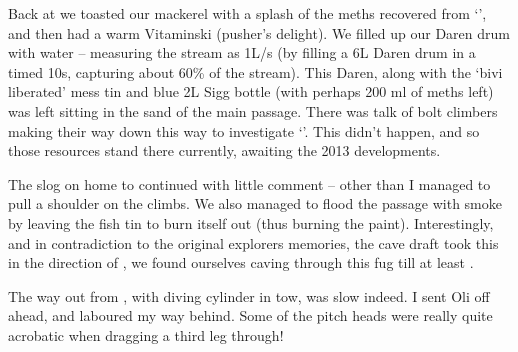 Back at  we toasted our mackerel with a splash of the meths
recovered from `', and then had a warm Vitaminski (pusher's
delight). We filled up our Daren drum with water -- measuring the  stream as 1L/s (by filling a 6L Daren drum in a timed 10s, capturing
about 60\% of the stream). This Daren, along with the `bivi liberated'
mess tin and blue 2L Sigg bottle (with perhaps 200 ml of meths left) was
left sitting in the sand of the main  passage. There was talk of
bolt climbers making their way down this way to investigate `'. This didn't happen, and so those resources stand there
currently, awaiting the 2013 developments.

The slog on home to  continued with little comment -- other
than I managed to pull a shoulder on the  climbs. We also
managed to flood the passage with smoke by leaving the fish tin to burn
itself out (thus burning the paint). Interestingly, and in contradiction
to the original explorers memories, the cave draft took this in the
direction of , we found ourselves caving through this fug till
at least .

The way out from , with diving cylinder in tow, was slow
indeed. I sent Oli off ahead, and laboured my way behind. Some of the
 pitch heads were really quite acrobatic when dragging a
third leg through!



